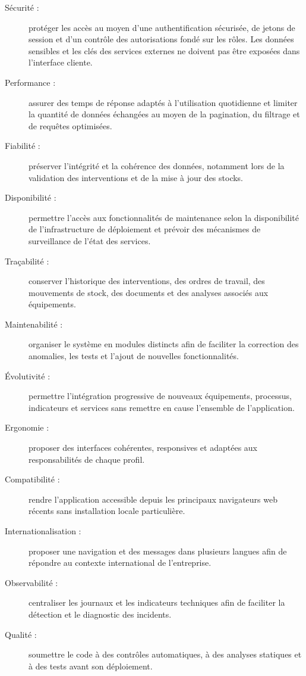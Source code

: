 \begin{description}
    \item[Sécurité :] protéger les accès au moyen d’une authentification sécurisée, de jetons de session et d’un contrôle des autorisations fondé sur les rôles. Les données sensibles et les clés des services externes ne doivent pas être exposées dans l’interface cliente.

    \item[Performance :] assurer des temps de réponse adaptés à l’utilisation quotidienne et limiter la quantité de données échangées au moyen de la pagination, du filtrage et de requêtes optimisées.

    \item[Fiabilité :] préserver l’intégrité et la cohérence des données, notamment lors de la validation des interventions et de la mise à jour des stocks.

    \item[Disponibilité :] permettre l’accès aux fonctionnalités de maintenance selon la disponibilité de l’infrastructure de déploiement et prévoir des mécanismes de surveillance de l’état des services.

    \item[Traçabilité :] conserver l’historique des interventions, des ordres de travail, des mouvements de stock, des documents et des analyses associés aux équipements.

    \item[Maintenabilité :] organiser le système en modules distincts afin de faciliter la correction des anomalies, les tests et l’ajout de nouvelles fonctionnalités.

    \item[Évolutivité :] permettre l’intégration progressive de nouveaux équipements, processus, indicateurs et services sans remettre en cause l’ensemble de l’application.

    \item[Ergonomie :] proposer des interfaces cohérentes, responsives et adaptées aux responsabilités de chaque profil.

    \item[Compatibilité :] rendre l’application accessible depuis les principaux navigateurs web récents sans installation locale particulière.

    \item[Internationalisation :] proposer une navigation et des messages dans plusieurs langues afin de répondre au contexte international de l’entreprise.

    \item[Observabilité :] centraliser les journaux et les indicateurs techniques afin de faciliter la détection et le diagnostic des incidents.

    \item[Qualité :] soumettre le code à des contrôles automatiques, à des analyses statiques et à des tests avant son déploiement.
\end{description}


